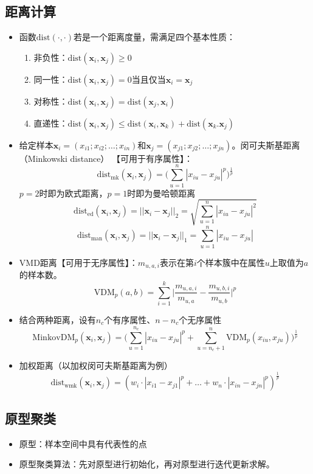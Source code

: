 \documentclass{ctexart}
\begin{document}
				\subsection{距离计算}
					\begin{itemize}
						\item 函数$\mathrm{dist}(\cdot,\cdot)$若是一个距离度量，需满足四个基本性质：\begin{enumerate}
							\item 非负性：$\mathrm{dist}(\bm{x}_i,\bm{x}_j)\ge0$
							\item 同一性：$\mathrm{dist}(\bm{x}_i,\bm{x}_j)=0$当且仅当$\bm{x}_i=\bm{x}_j$
							\item 对称性：$\mathrm{dist}(\bm{x}_i,\bm{x}_j)=\mathrm{dist}(\bm{x}_j,\bm{x}_i)$
							\item 直递性：$\mathrm{dist}(\bm{x}_i,\bm{x}_j)\le\mathrm{dist}(\bm{x}_i,\bm{x}_k)+\mathrm{dist}(\bm{x}_k.\bm{x}_j)$
						\end{enumerate}
						\item 给定样本$\bm{x}_i=(x_{i1};x_{i2};\dots;x_{in})$和$\bm{x}_j=(x_{j1};x_{j2};\dots;x_{jn})$。闵可夫斯基距离（Minkowski distance）  【可用于有序属性】：\[\mathrm{dist}_{\mathrm{mk}}(\bm{x}_i,\bm{x}_j)=\bigg(\sum_{u=1}^{n}|x_{iu}-x_{ju}|^p\bigg)^{\frac{1}{p}}\]$p=2$时即为欧式距离，$p=1$时即为曼哈顿距离\[\mathrm{dist_{ed}}(\bm{x}_i,\bm{x}_j)=||\bm{x}_i-\bm{x}_j||_2=\sqrt{\sum_{u=1}^{n}|x_{iu}-x_{ju}|^2}\]\[\mathrm{dist_{man}}(\bm{x}_i,\bm{x}_j)=||\bm{x}_i-\bm{x}_j||_1=\sum_{u=1}^{n}|x_{iu}-x_{ju}|\]
						\item VMD距离【可用于无序属性】：$m_{u,a,i}$表示在第$i$个样本簇中在属性$u$上取值为$a$的样本数。\[\mathrm{VDM}_p(a,b)=\sum_{i=1}^{k}\bigg|\frac{m_{u,a,i}}{m_{u,a}}-\frac{m_{u,b,i}}{m_{u,b}}\bigg|^p\]
						\item 结合两种距离，设有$n_c$个有序属性、$n-n_c$个无序属性\[\mathrm{MinkovDM}_p(\bm{x}_i,\bm{x}_j)=\bigg(\sum_{u=1}^{n_c}|x_{iu}-x_{ju}|^p+\sum_{u=n_c+1}^{n}\mathrm{VDM}_p(x_{iu},x_{ju})\bigg)^{\frac{1}{p}}\]
						\item 加权距离（以加权闵可夫斯基距离为例）\[\mathrm{dist_{wmk}}(\bm{x}_i,\bm{x}_j)=(w_i\cdot|x_{i1}-x_{j1}|^p+\dots+w_n\cdot|x_{in}-x_{jn}|^p)^{\frac{1}{p}}\]
					\end{itemize}
				\subsection{原型聚类}
					\begin{itemize}
						\item 原型：样本空间中具有代表性的点
						\item 原型聚类算法：先对原型进行初始化，再对原型进行迭代更新求解。
					\end{itemize}
\end{document}

